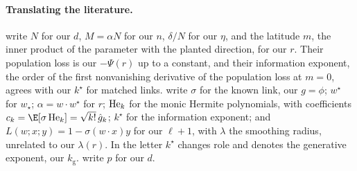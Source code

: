 \begin{refsection}
\paragraph{Translating the literature.}
\Textcite{BenArousGheissariJagannath2021} write $N$ for our $d$, $M=\alpha N$ for our $n$, $\delta/N$ for our $\eta$, and the latitude $m$, the inner product of the parameter with the planted direction, for our $r$. Their population loss is our $-\Psi(r)$ up to a constant, and their information exponent, the order of the first nonvanishing derivative of the population loss at $m=0$, agrees with our $k^\star$ for matched links. \Textcite{DamianEtAl2023} write $\sigma$ for the known link, our $g=\phi$; $w^\star$ for $w_\star$; $\alpha=w\cdot w^\star$ for $r$; $\operatorname{He}_k$ for the monic Hermite polynomials, with coefficients $c_k=\E[\sigma\He_k]=\sqrt{k!}\,\hat g_k$; $k^\star$ for the information exponent; and $L(w;x;y)=1-\sigma(w\cdot x)y$ for our $\ell+1$, with $\lambda$ the smoothing radius, unrelated to our $\lambda(r)$. In \textcite{DamianEtAl2024} the letter $k^\star$ changes role and denotes the generative exponent, our $k_{\mathrm g}$. \Textcite{DudejaHsu2018} write $p$ for our $d$.

\printchapterbib
\end{refsection}
